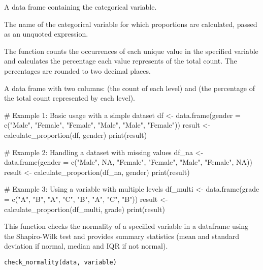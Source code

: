 \documentclass[a4paper]{book}
\begin{document}
%
\begin{Arguments}
\begin{ldescription}
\item[\code{df}] A data frame containing the categorical variable.

\item[\code{variable\_name}] The name of the categorical variable for which proportions are calculated, passed as an unquoted expression.
\end{ldescription}
\end{Arguments}
%
\begin{Details}
The function counts the occurrences of each unique value in the specified variable and calculates the percentage each value represents of the total count.
The percentages are rounded to two decimal places.
\end{Details}
%
\begin{Value}
A data frame with two columns:  (the count of each level) and  (the percentage of the total count represented by each level).
\end{Value}
%
\begin{Examples}
\begin{ExampleCode}
# Example 1: Basic usage with a simple dataset
df <- data.frame(gender = c("Male", "Female", "Female", "Male", "Male", "Female"))
result <- calculate_proportion(df, gender)
print(result)

# Example 2: Handling a dataset with missing values
df_na <- data.frame(gender = c("Male", NA, "Female", "Female", "Male", "Female", NA))
result <- calculate_proportion(df_na, gender)
print(result)

# Example 3: Using a variable with multiple levels
df_multi <- data.frame(grade = c("A", "B", "A", "C", "B", "A", "C", "B"))
result <- calculate_proportion(df_multi, grade)
print(result)

\end{ExampleCode}
\end{Examples}
%
\begin{Description}
This function checks the normality of a specified variable in a dataframe using the Shapiro-Wilk test
and provides summary statistics (mean and standard deviation if normal, median and IQR if not normal).
\end{Description}
%
\begin{Usage}
\begin{verbatim}
check_normality(data, variable)
\end{verbatim}
\end{Usage}
\end{document}
